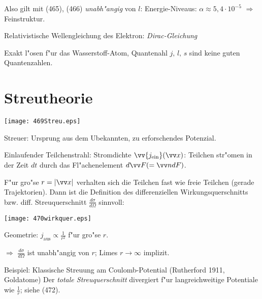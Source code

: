 \documentclass[a4paper]{scrartcl}
\begin{document}
Also gilt mit (465), (466) \emph{unabh"angig} von $l$:
Energie-Niveaus:
$\alpha \approx 5,4 \cdot 10^{-5}$ $\Longrightarrow$ Feinstruktur.

Relativistische Wellengleichung des Elektron: \emph{Dirac-Gleichung}

Exakt l"osen f"ur das Wasserstoff-Atom, Quantenahl $j, \, l, \, s$ sind keine guten Quantenzahlen.

\section{Streutheorie}

\begin{center}
\texttt{[image: 469Streu.eps]}
\end{center}
Streuer: Ursprung aus dem Ubekannten, zu erforschendes Potenzial.

Einlaufender Teilchenstrahl: Stromdichte $\vv{j_\mathrm{ein}}(\vv x)$:
Teilchen str"omen in der Zeit $dt$ durch das Fl"achenelement $d \vv F ( = \vv n dF)$.

F"ur gro"se $r= \vert \vv x \vert$ verhalten sich die Teilchen fast wie freie Teilchen (gerade Trajektorien). Dann ist die Definition des differenziellen Wirkungsquerschnitts bzw. diff. Streuquerschnitt $\frac{d \sigma}{d \Omega}$ sinnvoll:
\begin{center}
\texttt{[image: 470wirkquer.eps]}
\end{center}
Geometrie: $j_\mathrm{aus} \propto \frac1{r^2}$ f"ur gro"se $r$.

$\Longrightarrow$ $\frac{d\sigma}{d\Omega}$ ist unabh"angig von $r$; Limes $r \longrightarrow \infty$ implizit.

Beispiel: Klassische Streuung am Coulomb-Potential (Rutherford 1911, Goldatome)
Der \emph{totale Streuquerschnitt}
divergiert f"ur langreichweitige Potentiale wie $\frac1r$; siehe (472).
\end{document}
